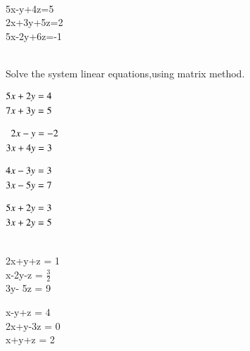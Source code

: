 \\
\solution 

\item 5x-y+4z=5 \\ 2x+3y+5z=2 \\ 5x-2y+6z=-1\\
\\
\solution

Solve the system linear equations,using matrix method.
\item 
$\begin{alignedat}[t]{2}
5x+2y&=4 \\ 7x+3y&=5
\end{alignedat}$
\\
\solution

\item 
$\begin{alignedat}[t]{2}
2x-y&=-2 \\ 3x+4y&=3
\end{alignedat}$
\\
\solution

\item $\begin{alignedat}[t]{2}
4x-3y&=3 \\ 3x-5y&=7
\end{alignedat}$
\\
\solution

\item $\begin{alignedat}[t]{2}
5x+2y&=3 \\ 3x+2y&=5
\end{alignedat}$\\
\\
\solution

\item 2x+y+z = 1 \\ x-2y-z = $\frac{3}{2}$ \\ 3y- 5z = 9\\
\item x-y+z = 4 \\ 2x+y-3z = 0 \\ x+y+z = 2\\
